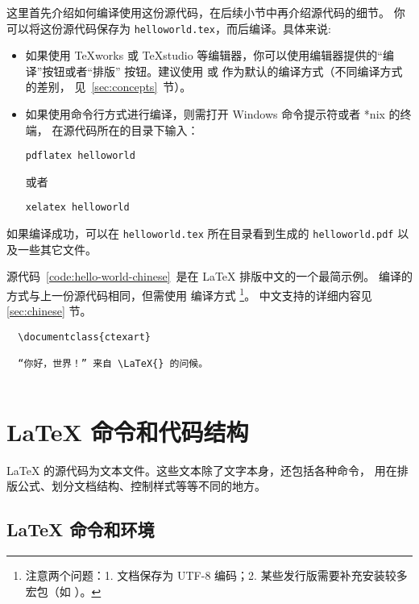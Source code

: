 这里首先介绍如何编译使用这份源代码，在后续小节中再介绍源代码的细节。
你可以将这份源代码保存为 \texttt{helloworld.tex}，而后编译。具体来说:
\begin{itemize}
  \item 如果使用 TeXworks 或 TeXstudio 等编辑器，你可以使用编辑器提供的“编译”按钮或者“排版”
  按钮。建议使用  或  作为默认的编译方式（不同编译方式的差别，
  见~\ref{sec:concepts}~节）。
  \item 如果使用命令行方式进行编译，则需打开 Windows 命令提示符或者 *nix 的终端，
  在源代码所在的目录下输入：
\begin{verbatim}
pdflatex helloworld
\end{verbatim}
或者
\begin{verbatim}
xelatex helloworld
\end{verbatim}
\end{itemize}

如果编译成功，可以在 \texttt{helloworld.tex} 所在目录看到生成的 \texttt{helloworld.pdf} 以及一些其它文件。

源代码~\ref{code:hello-world-chinese}~是在 \LaTeX{} 排版中文的一个最简示例。
编译的方式与上一份源代码相同，但需使用  编译方式%
\footnote{注意两个问题：1. 文档保存为 UTF-8 编码；2. 某些发行版需要补充安装较多宏包（如 ）。}。
中文支持的详细内容见 \ref{sec:chinese} 节。

\begin{sourcecode}[htp]
  \begin{Verbatim}
  \documentclass{ctexart}
  
  “你好，世界！” 来自 \LaTeX{} 的问候。
  
  \end{Verbatim}
  \caption{在\LaTeX{} 中排版中文的最简源代码示例。}\label{code:hello-world-chinese}
\end{sourcecode}

\section{\LaTeX{} 命令和代码结构}\label{sec:src}

\LaTeX{} 的源代码为文本文件。这些文本除了文字本身，还包括各种命令，
用在排版公式、划分文档结构、控制样式等等不同的地方。

\subsection{\LaTeX{} 命令和环境}\label{subsec:cmds}

